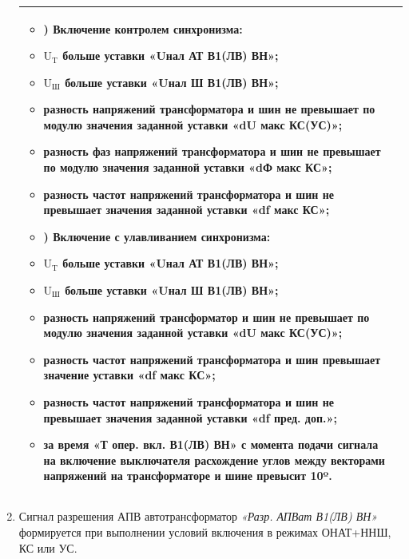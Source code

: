 \begin{enumerate}[label=\arabic{section}.\arabic{subsection}.\arabic{subsubsection}.\arabic*,  align=left, labelsep=4pt, leftmargin=0pt, itemindent=57pt]
\begin{longtable}{|>{\centering\arraybackslash}m{5.3cm}|>{\centering\arraybackslash}m{11.6cm}|}
			\begin{itemize}
			\item[] \noindent 1) Включение контролем синхронизма:
			\item $ \textrm{U}_\textrm{T} $ больше уставки \textbf{«Uнал АТ В1(ЛВ) ВН»};
			\item $ \textrm{U}_\textrm{Ш} $ больше уставки \textbf{«Uнал Ш В1(ЛВ) ВН»};
			\item разность напряжений трансформатора и шин не превышает по модулю значения заданной уставки \textbf{«dU макс КС(УС)»};
			\item разность фаз напряжений трансформатора и шин не превышает по модулю значения заданной уставки \textbf{«dФ макс КС»};
			\item разность частот напряжений трансформатора и шин не превышает значения заданной уставки \textbf{«df макс КС»};
			\end{itemize}
			
			\begin{itemize}
			\item[] \noindent  2) Включение с улавливанием синхронизма:
			\item $ \textrm{U}_\textrm{T} $ больше уставки \textbf{«Uнал АТ В1(ЛВ) ВН»};
			\item $ \textrm{U}_\textrm{Ш} $ больше уставки \textbf{«Uнал Ш В1(ЛВ) ВН»};
			\item разность напряжений трансформатор и шин не превышает по модулю значения заданной уставки \textbf{«dU макс КС(УС)»};
			\item разность частот напряжений трансформатора и шин превышает значение уставки \textbf{«df макс КС»};
			\item разность частот напряжений трансформатора и шин не превышает значения заданной уставки \textbf{«df пред. доп.»};
			\item за время \textbf{«Т опер. вкл. В1(ЛВ) ВН»} с момента подачи сигнала на включение выключателя расхождение углов между векторами напряжений на трансформаторе и шине превысит 10º.
			\vspace{3pt}
			\end{itemize} \\
\hline

\end{longtable}
\normalsize	

\item
Сигнал разрешения АПВ автотрансформатор \textit{«Разр. АПВат В1(ЛВ) ВН»} формируется при
выполнении условий включения в режимах ОНАТ+ННШ, КС или УС.


\end{enumerate}
